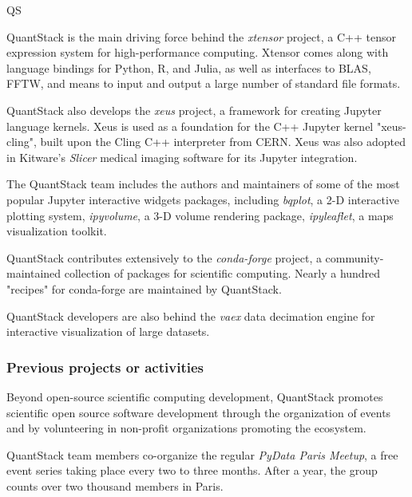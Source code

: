 \begin{sitedescription}{QS}
\begin{compactenum}
\item QuantStack is the main driving force behind the \emph{xtensor} project, a C++ tensor expression system for high-performance computing. Xtensor comes along with language bindings for Python, R, and Julia, as well as interfaces to BLAS, FFTW, and means to input and output a large number of standard file formats.

\item QuantStack also develops the \emph{xeus} project, a framework for creating Jupyter language kernels. Xeus is used as a foundation for the C++ Jupyter kernel "xeus-cling", built upon the Cling C++ interpreter from CERN. Xeus was also adopted in Kitware's \emph{Slicer} medical imaging software for its Jupyter integration.

\item The QuantStack team includes the authors and maintainers of some of the most popular Jupyter interactive widgets packages, including \emph{bqplot}, a 2-D interactive plotting system, \emph{ipyvolume}, a 3-D volume rendering package, \emph{ipyleaflet}, a maps visualization toolkit.

\item QuantStack contributes extensively to the \emph{conda-forge} project, a community-maintained collection of packages for scientific computing. Nearly a hundred "recipes" for conda-forge are maintained by QuantStack.

\item QuantStack developers are also behind the \emph{vaex} data decimation engine for interactive visualization of large datasets.

\end{compactenum}

\subsubsection*{Previous projects or activities}

\par Beyond open-source scientific computing development, QuantStack promotes scientific open source software development through the organization of events and by volunteering in non-profit organizations promoting the ecosystem.

\begin{compactenum}

\item QuantStack team members co-organize the regular \emph{PyData Paris Meetup}, a free event series taking place every two to three months. After a year, the group counts over two thousand members in Paris.


\end{compactenum}
\end{sitedescription}
